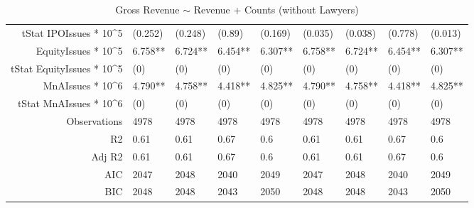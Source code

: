 \begin{table}[ht]
\begin{tabular}{rllllllll}
  tStat IPOIssues * 10^5 & (0.252) & (0.248) & (0.89) & (0.169) & (0.035) & (0.038) & (0.778) & (0.013) \\ 
  EquityIssues * 10^5 & 6.758** & 6.724** & 6.454** & 6.307** & 6.758** & 6.724** & 6.454** & 6.307** \\ 
  tStat EquityIssues * 10^5 & (0) & (0) & (0) & (0) & (0) & (0) & (0) & (0) \\ 
  MnAIssues * 10^6 & 4.790** & 4.758** & 4.418** & 4.825** & 4.790** & 4.758** & 4.418** & 4.825** \\ 
  tStat MnAIssues * 10^6 & (0) & (0) & (0) & (0) & (0) & (0) & (0) & (0) \\ 
  Observations & 4978 & 4978 & 4978 & 4978 & 4978 & 4978 & 4978 & 4978 \\ 
  R2 & 0.61 & 0.61 & 0.67 & 0.6 & 0.61 & 0.61 & 0.67 & 0.6 \\ 
  Adj R2 & 0.61 & 0.61 & 0.67 & 0.6 & 0.61 & 0.61 & 0.67 & 0.6 \\ 
  AIC & 2047 & 2048 & 2040 & 2049 & 2047 & 2048 & 2040 & 2049 \\ 
  BIC & 2048 & 2048 & 2043 & 2050 & 2048 & 2048 & 2043 & 2050 \\ 
   \hline
\end{tabular}
\caption{Gross Revenue $\sim$ Revenue + Counts (without Lawyers)} 
\end{table}
